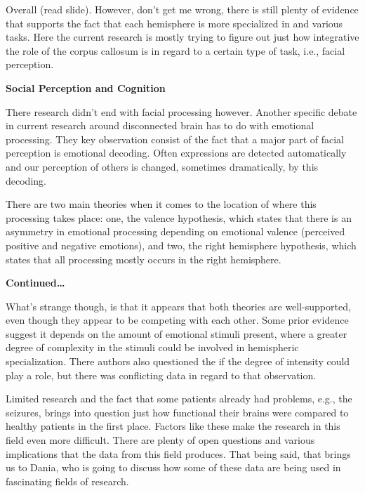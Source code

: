 \documentclass[basic]{inVerba-notes}
\begin{document}
Overall (read slide). However, don't get me wrong, there is still plenty of evidence that supports the fact that each hemisphere is more specialized in and various tasks. Here the current research is mostly trying to figure out just how integrative the role of the corpus callosum is in regard to a certain type of task, i.e., facial perception.

\textbf{Social Perception and Cognition}

There research didn't end with facial processing however. Another specific debate in current research around disconnected brain has to do with emotional processing. They key observation consist of the fact that a major part of facial perception is emotional decoding. Often expressions are detected automatically and our perception of others is changed, sometimes dramatically, by this decoding. 

There are two main theories when it comes to the location of where this processing takes place: one, the valence hypothesis, which states that there is an asymmetry in emotional processing depending on emotional valence (perceived positive and negative emotions), and two, the right hemisphere hypothesis, which states that all processing mostly occurs in the right hemisphere.

\textbf{Continued\dots}

What's strange though, is that it appears that both theories are well-supported, even though they appear to be competing with each other. Some prior evidence suggest it depends on the amount of emotional stimuli present, where a greater degree of complexity in the stimuli could be involved in hemispheric specialization. There authors also questioned the if the degree of intensity could play a role, but there was conflicting data in regard to that observation. 

Limited research and the fact that some patients already had problems, e.g., the seizures, brings into question just how functional their brains were compared to healthy patients in the first place. Factors like these make the research in this field even more difficult. There are plenty of open questions and various implications that the data from this field produces. That being said, that brings us to Dania, who is going to discuss how some of these data are being used in fascinating fields of research.
\end{document}
